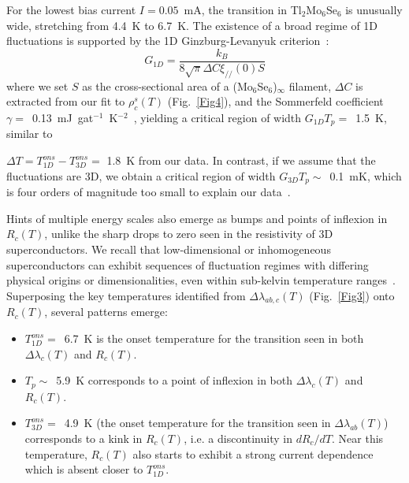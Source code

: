 \documentclass[prb,twocolumn,showpacs,preprintnumbers,amsmath,amssymb,floatfix,groupedaddress,superscriptaddress,aps,10pt]{revtex4-1}
\newcommand{\Tl}{Tl$_2$Mo$_6$Se$_6$}
\begin{document}
For the lowest bias current $I= 0.05$~mA, the transition in {\Tl} is unusually wide, stretching from 4.4~K to 6.7~K. The existence of a broad regime of 1D fluctuations is supported by the 1D Ginzburg-Levanyuk criterion~\cite{Mishonov2003,Larkin2008}:
\begin{equation} \label{G1D}
G_{1D}=\frac{k_B}{8\sqrt{\pi}\Delta{C}\xi_{/\!/}(0)S}
\end{equation}
where we set $S$ as the cross-sectional area of a (Mo$_6$Se$_6$)$_\infty$ filament, $\Delta{C}$ is extracted from our fit to $\rho^s_c(T)$ (Fig.~\ref{Fig4}), and the Sommerfeld coefficient $\gamma=$~0.13~mJ~gat$^{-1}$~K$^{-2}$~\cite{Petrovic2010}, yielding a critical region of width $G_{1D}T_p=$~1.5~K, similar to {$\Delta T=T_{1D}^{ons}-T_{3D}^{ons}=$ 1.8~K from our data. In contrast, if we assume that the fluctuations are 3D, we obtain a critical region of width $G_{3D}T_p\sim$~0.1~mK, which is four orders of magnitude too small to explain our data~\cite{Petrovic2007}.  

Hints of multiple energy scales also emerge as bumps and points of inflexion in $R_c(T)$, unlike the sharp drops to zero seen in the resistivity of 3D superconductors.  We recall that low-dimensional or inhomogeneous superconductors can exhibit sequences of fluctuation regimes with differing physical origins or dimensionalities, even within sub-kelvin temperature ranges~\cite{Larkin2008,Glatz2011,Klemencic2017}. Superposing the key temperatures identified from $\Delta\lambda_{ab,c}(T)$ (Fig.~\ref{Fig3}) onto $R_c(T)$, several patterns emerge:

\begin{itemize}
	\item $T_{1D}^{ons}=$~6.7~K is the onset temperature for the transition seen in both $\Delta\lambda_c(T)$ and $R_c(T)$.  
	\item $T_p\sim$~5.9~K corresponds to a point of inflexion in both $\Delta\lambda_c(T)$ and $R_c(T)$.
	\item $T_{3D}^{ons}=$~4.9~K (the onset temperature for the transition seen in $\Delta\lambda_{ab}(T)$) corresponds to a kink in $R_c(T)$, i.e. a discontinuity in $dR_c/dT$.  Near this temperature, $R_c(T)$ also starts to exhibit a strong current dependence which is absent closer to $T_{1D}^{ons}$.
	\end{itemize}

}
\end{document}
